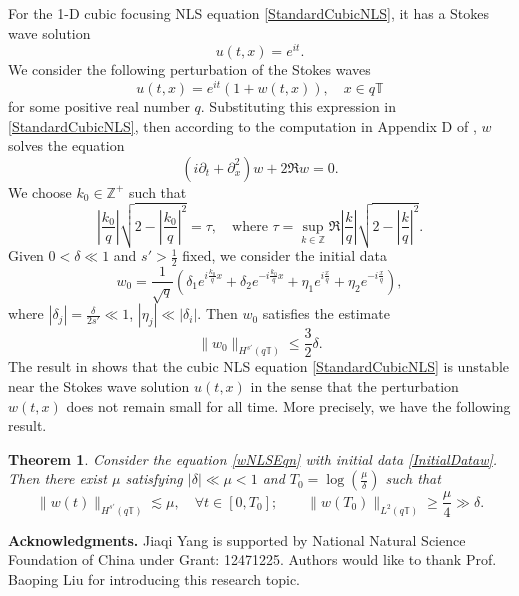 \documentclass[12pt]{amsart}
\newtheorem{theorem}{Theorem}[section]
\theoremstyle{remark}
\theoremstyle{definition}
\numberwithin{equation}{section}
\newcommand{\p}{\partial}
\newcommand{\Z}{\mathbb{Z}}
\newcommand{\T}{\mathbb{T}}
\newcommand{\f}{\frac}
\begin{document}
For the 1-D cubic focusing NLS equation \eqref{StandardCubicNLS}, it has a Stokes wave solution
\begin{equation*} %
    u(t,x) = e^{it}.
\end{equation*}
We consider the following perturbation of the Stokes waves
\begin{equation*}
    u(t,x) = e^{it}(1+ w(t,x)), \quad x\in q\T
\end{equation*}
for some positive real number $q$.
Substituting this expression in \eqref{StandardCubicNLS}, then according to the computation in Appendix D of  \cite{MR4627323}, $w$ solves the  equation
\begin{equation} \label{wNLSEqn}
(i\p_t + \p_x^2)w + 2\Re w = 0.
\end{equation}
We choose $k_0 \in \Z^+$ such that
\begin{equation*}
\left|\frac{k_0}{q}\right| \sqrt{2-\left|\frac{k_0}{q}\right|^2} = \tau,\quad\text{where } \tau = \sup_{k\in \Z} \Re \left|\frac{k}{q}\right| \sqrt{2-\left|\frac{k}{q}\right|^2}.
\end{equation*}
Given $0<\delta\ll 1$ and $s' > \f12$ fixed, we consider the initial data
\begin{equation} \label{InitialDataw}
  w_0 = \frac{1}{\sqrt{q}}\left(\delta_1 e^{i\frac{k_0}{q}x} + \delta_2 e^{-i\frac{k_0}{q}x} +\eta_1 e^{i\frac{x}{q}} +\eta_2 e^{-i\frac{x}{q}}\right),
\end{equation}
where $|\delta_j| = \frac{\delta}{2s'}\ll 1$, $|\eta_j|\ll |\delta_i|$.
Then $w_0$ satisfies the estimate
\begin{equation*}
 \|w_0\|_{H^{s'}(q\T)} \leq \f32 \delta.
\end{equation*}
The result in \cite{MR4627323} shows that the cubic NLS equation \eqref{StandardCubicNLS} is unstable near the Stokes wave solution $u(t,x)$ in the sense that the perturbation $w(t,x)$ does not remain small for all time.
More precisely, we have the following result.
\begin{theorem}\label{t:NLSInstability}
Consider the equation \eqref{wNLSEqn} with initial data \eqref{InitialDataw}.
Then there exist $\mu$ satisfying $|\delta| \ll \mu < 1$ and $T_0 = \log \left(\frac{\mu}{\delta}\right)$
such that
\begin{equation} \label{wT0Est}
 \|w(t) \|_{H^{s'}(q\T)} \lesssim \mu, \quad \forall t \in [0, T_0]; \qquad  \|w(T_0) \|_{L^2(q\T)} \geq \frac{\mu}{4} \gg \delta.
\end{equation}
\end{theorem}

\textbf{Acknowledgments.}
Jiaqi Yang is supported by National Natural Science Foundation of China under Grant: 12471225.
Authors would like to thank Prof. Baoping Liu for introducing this research topic. 



	
\end{document}
